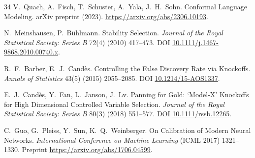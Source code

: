 \documentclass[a4paper,longmktitle]{cas-sc}
\begin{document}
\begin{thebibliography}{34}
 V.~Quach, A.~Fisch, T.~Schuster, A.~Yala, J.~H.~Sohn. Conformal Language Modeling. arXiv preprint (2023). \url{https://arxiv.org/abs/2306.10193}.

 N.~Meinshausen, P.~B\"uhlmann. Stability Selection. \emph{Journal of the Royal Statistical Society: Series B} 72(4) (2010) 417--473. DOI \url{10.1111/j.1467-9868.2010.00740.x}.

 R.~F.~Barber, E.~J.~Cand\`es. Controlling the False Discovery Rate via Knockoffs. \emph{Annals of Statistics} 43(5) (2015) 2055--2085. DOI \url{10.1214/15-AOS1337}.

 E.~J.~Cand\`es, Y.~Fan, L.~Janson, J.~Lv. Panning for Gold: `Model-X' Knockoffs for High Dimensional Controlled Variable Selection. \emph{Journal of the Royal Statistical Society: Series B} 80(3) (2018) 551--577. DOI \url{10.1111/rssb.12265}.

 C.~Guo, G.~Pleiss, Y.~Sun, K.~Q.~Weinberger. On Calibration of Modern Neural Networks. \emph{International Conference on Machine Learning} (ICML 2017) 1321--1330. Preprint \url{https://arxiv.org/abs/1706.04599}.

\end{thebibliography}
\end{document}
